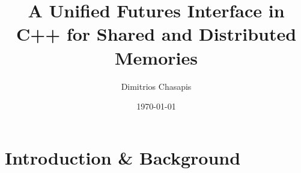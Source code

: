 \documentclass[svgnames]{beamer}
\title{\Large \bf
A Unified Futures Interface in C++ for Shared and Distributed Memories}
\author[\tiny \thepage /28]{Dimitrios Chasapis}
\institute{PARSYS - LRI}
\date{\today}
\begin{document}

\frame[plain]{\titlepage}
\setcounter{framenumber}{0}

\section{Introduction \& Background}
\end{document}
